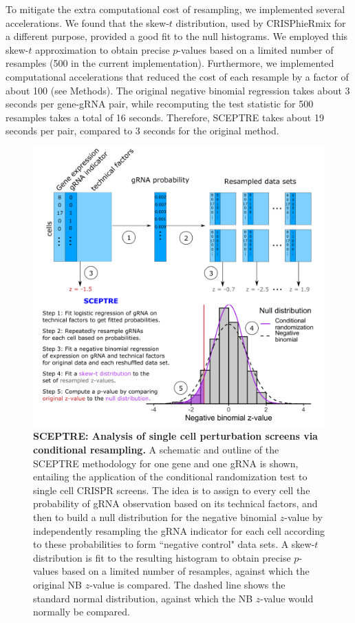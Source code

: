 \documentclass{nature}
\begin{document}
To mitigate the extra computational cost of resampling, we implemented several accelerations. We found that the skew-$t$ distribution, used by CRISPhieRmix\cite{Daley2018} for a different purpose, provided a good fit to the null histograms. We employed this skew-$t$ approximation to obtain precise $p$-values based on a limited number of resamples (500 in the current implementation). Furthermore, we implemented computational accelerations that reduced the cost of each resample by a factor of about 100 (see Methods). The original negative binomial regression takes about 3 seconds per gene-gRNA pair, while recomputing the test statistic for 500 resamples takes a total of 16 seconds. Therefore, SCEPTRE takes about 19 seconds per pair, compared to 3 seconds for the original method.

\clearpage
\thispagestyle{empty}
\begin{figure}[h!]
	\includegraphics[width = \textwidth]{figures/Figure2/Figure2.png}
	\caption{\textbf{SCEPTRE: Analysis of single cell perturbation screens via conditional resampling.} A schematic and outline of the SCEPTRE methodology for one gene and one gRNA is shown, entailing the application of the conditional randomization test\cite{CetL16} to single cell CRISPR screens. The idea is to assign to every cell the probability of gRNA observation based on its technical factors, and then to build a null distribution for the negative binomial $z$-value by independently resampling the gRNA indicator for each cell according to these probabilities to form ``negative control" data sets. A skew-$t$ distribution is fit to the resulting histogram to obtain precise $p$-values based on a limited number of resamples, against which the original NB $z$-value is compared. The dashed line shows the standard normal distribution, against which the NB $z$-value would normally be compared.}
	\label{fig:method}
\end{figure}
\clearpage
\end{document}

